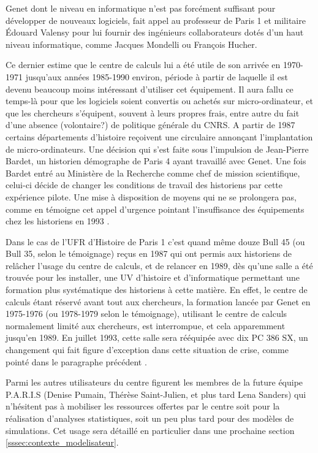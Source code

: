 Genet dont le niveau en informatique n'est pas forcément suffisant pour développer de nouveaux logiciels, fait appel au professeur de Paris 1 et militaire Édouard Valensy pour lui fournir des ingénieurs collaborateurs dotés d'un haut niveau informatique, comme Jacques Mondelli ou François Hucher. 

Ce dernier estime que le centre de calculs lui a été utile de son arrivée en 1970-1971 jusqu'aux années 1985-1990 environ, période à partir de laquelle il est devenu beaucoup moins intéressant d'utiliser cet équipement. Il aura fallu ce temps-là pour que les logiciels soient convertis ou achetés sur micro-ordinateur, et que les chercheurs s'équipent, souvent à leurs propres frais, entre autre du fait d'une absence (volontaire?) de politique générale du CNRS. A partir de 1987 certains départements d'histoire reçoivent une circulaire annonçant l'implantation de micro-ordinateurs. Une décision qui s'est faite sous l'impulsion de Jean-Pierre Bardet, un historien démographe de Paris 4 ayant travaillé avec Genet. Une fois Bardet entré au Ministère de la Recherche comme chef de mission scientifique, celui-ci décide de changer les conditions de travail des historiens par cette expérience pilote. Une mise à disposition de moyens qui ne se prolongera pas, comme en témoigne cet appel d'urgence pointant l'insuffisance des équipements chez les historiens en 1993 \autocite{Genet1993}. %

Dans le cas de l'UFR d'Histoire de Paris 1 c'est quand même douze Bull 45 (ou Bull 35, selon le témoignage) reçus en 1987 qui ont permis aux historiens de relâcher l'usage du centre de calculs, et de relancer en 1989, dès qu'une salle a été trouvée pour les installer, une UV d'histoire et d'informatique permettant une formation plus systématique des historiens à cette matière. En effet, le centre de calculs étant réservé avant tout aux chercheurs, la formation lancée par Genet en 1975-1976 (ou 1978-1979 selon le témoignage), utilisant le centre de calculs normalement limité aux chercheurs, est interrompue, et cela apparemment jusqu'en 1989. En juillet 1993, cette salle sera rééquipée avec dix PC 386 SX, un changement qui fait figure d'exception dans cette situation de crise, comme pointé dans le paragraphe précédent \autocite{Genet1993}.

Parmi les autres utilisateurs du centre figurent les membres de la future équipe P.A.R.I.S (Denise Pumain, Thérèse Saint-Julien, et plus tard Lena Sanders) qui n'hésitent pas à mobiliser les ressources offertes par le centre soit pour la réalisation d'analyses statistiques, soit un peu plus tard pour des modèles de simulations. Cet usage sera détaillé en particulier dans une prochaine section \ref{sssec:contexte_modelisateur}.

